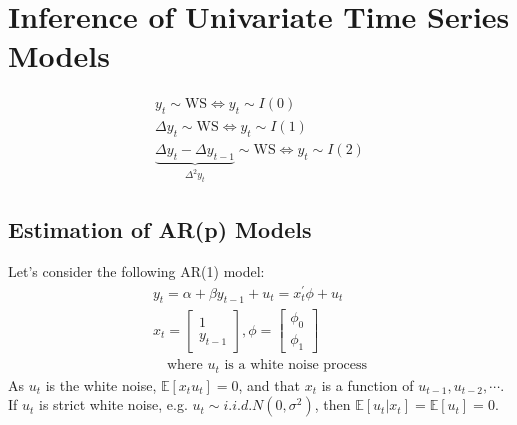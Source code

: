 \section{Inference of Univariate Time Series Models}
\label{sec:inference-univariate-time-series-models}

\begin{gather*}
    y_t \sim \text{WS} \Leftrightarrow y_t \sim I(0) \\
    \Delta y_t \sim \text{WS} \Leftrightarrow y_t \sim I(1) \\
    \underset{\Delta^2 y_t}{\underbrace{\Delta y_t - \Delta y_{t-1}}} \sim \text{WS} \Leftrightarrow y_t \sim I(2)
\end{gather*}

\subsection{Estimation of AR(p) Models}

Let's consider the following AR(1) model:
\begin{gather*}
    y_t = \alpha + \beta y_{t-1} + u_t = x_t^{\prime} \phi + u_t\\
    x_t = \begin{bmatrix} 1 \\ y_{t-1} \end{bmatrix}, \phi = \begin{bmatrix} \phi_0 \\ \phi_1 \end{bmatrix} \\
    \quad \text{where } u_t \text{ is a white noise process}
\end{gather*}
As $u_t$ is the white noise, $\mathbb{E}[x_t u_t] = 0$, and that $x_t$ is a function of $u_{t-1}, u_{t-2}, \cdots$.
If $u_t$ is strict white noise, e.g. $u_t \sim i.i.d. N(0, \sigma^2)$, then $\mathbb{E}[u_t | x_t] = \mathbb{E}[u_t] = 0$.


